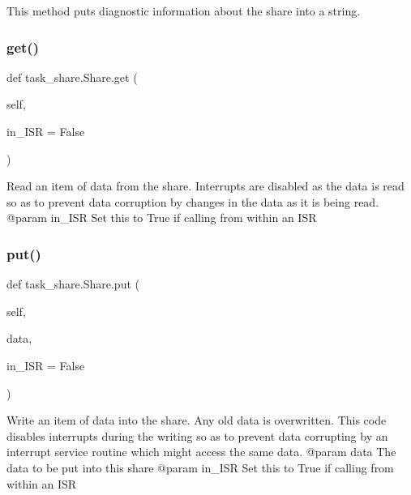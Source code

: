 \begin{DoxyVerb}This method puts diagnostic information about the share into a 
string. \end{DoxyVerb}
 \mbox{\label{classtask__share_1_1_share_a599cd89ed1cd79af8795a51d8de70d27}} 
\subsubsection{\texorpdfstring{get()}{get()}}
{\footnotesize\ttfamily def task\+\_\+share.\+Share.\+get (\begin{DoxyParamCaption}\item[{}]{self,  }\item[{}]{in\+\_\+\+I\+SR = {\ttfamily False} }\end{DoxyParamCaption})}

\begin{DoxyVerb}Read an item of data from the share. Interrupts are disabled as
the data is read so as to prevent data corruption by changes in
the data as it is being read. 
@param in_ISR Set this to True if calling from within an ISR \end{DoxyVerb}
 \mbox{\label{classtask__share_1_1_share_ab449c261f259db176ffeea55ccbf5d96}} 
\subsubsection{\texorpdfstring{put()}{put()}}
{\footnotesize\ttfamily def task\+\_\+share.\+Share.\+put (\begin{DoxyParamCaption}\item[{}]{self,  }\item[{}]{data,  }\item[{}]{in\+\_\+\+I\+SR = {\ttfamily False} }\end{DoxyParamCaption})}

\begin{DoxyVerb}Write an item of data into the share. Any old data is overwritten.
This code disables interrupts during the writing so as to prevent
data corrupting by an interrupt service routine which might access
the same data.
@param data The data to be put into this share
@param in_ISR Set this to True if calling from within an ISR \end{DoxyVerb}
 

